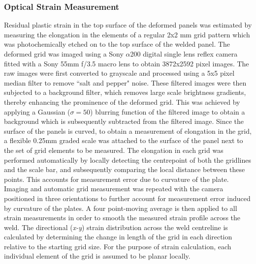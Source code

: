\subsubsection{Optical Strain Measurement}
\label{EMOpticalStrainMeasurement}
Residual plastic strain in the top surface of the deformed panels was estimated by measuring the elongation in the elements of a regular 2x2 mm grid pattern which was photochemically etched on to the top surface of the welded panel. The deformed grid was imaged using a Sony $\alpha$200 digital single lens reflex camera fitted with a Sony 55mm f/3.5 macro lens to obtain 3872x2592 pixel images. The raw images were first converted to grayscale and processed using a 5x5 pixel median filter to remove ``salt and pepper" noise. These filtered images were then subjected to a background filter, which removes large scale brightness gradients, thereby enhancing the prominence of the deformed grid. This was achieved by applying a Gaussian ($\sigma=50$) blurring function of the filtered image to obtain a background which is subsequently subtracted from the filtered image. Since the surface of the panels is curved, to obtain a measurement of elongation in the grid, a flexible 0.25mm graded scale was attached to the surface of the panel next to the set of grid elements to be measured. The elongation in each grid was performed automatically by locally detecting the centrepoint of both the gridlines and the scale bar, and subsequently comparing the local distance between these points. This accounts for measurement error due to curvature of the plate. Imaging and automatic grid measurement was repeated with the camera positioned in three orientations to further account for measurement error induced by curvature of the plates. A four point-moving average is then applied to all strain measurements in order to smooth the measured strain profile across the weld. The directional (\textit{x-y}) strain distribution across the weld centreline is calculated by determining the change in length of the grid in each direction relative to the starting grid size. For the purpose of strain calculation, each individual element of the grid is assumed to be planar locally.


